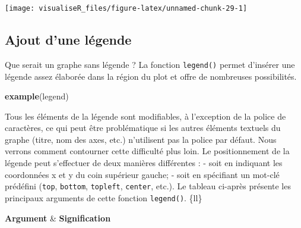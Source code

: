 \documentclass[]{article}
\newenvironment{Shaded}{\begin{snugshade}}{\end{snugshade}}
\newcommand{\KeywordTok}[1]{\textcolor[rgb]{0.13,0.29,0.53}{\textbf{#1}}}
\newcommand{\NormalTok}[1]{#1}
\begin{document}
\begin{center}\texttt{[image: visualiseR\_files/figure-latex/unnamed-chunk-29-1]} \end{center}

\hypertarget{ajout-dune-luxe9gende}{%
\subsection{Ajout d'une légende}\label{ajout-dune-luxe9gende}}

Que serait un graphe sans légende ? La fonction \texttt{legend()} permet d'insérer une légende assez élaborée dans la région du plot et offre de nombreuses possibilités.

\begin{Shaded}
\begin{Highlighting}[]
\KeywordTok{example}\NormalTok{(legend)}
\end{Highlighting}
\end{Shaded}

Tous les éléments de la légende sont modifiables, à l'exception de la police de caractères, ce qui peut être problématique si les autres éléments textuels du graphe (titre, nom des axes, etc.) n'utilisent pas la police par défaut. Nous verrons comment contourner cette difficulté plus loin.
Le positionnement de la légende peut s'effectuer de deux manières différentes :
- soit en indiquant les coordonnées x et y du coin supérieur gauche;
- soit en spécifiant un mot-clé prédéfini (\texttt{top}, \texttt{bottom}, \texttt{topleft}, \texttt{center}, etc.).
Le tableau ci-après présente les principaux arguments de cette fonction \texttt{legend()}.
\{ll\}

\textbf{Argument} \& \textbf{Signification}
\end{document}
